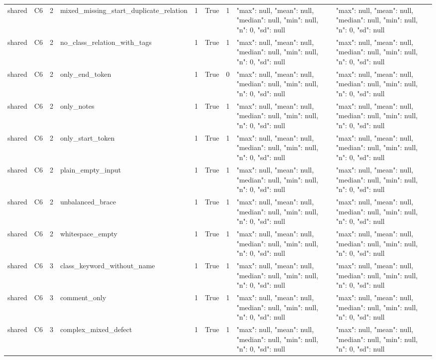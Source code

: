 \begin{tabular}{lllllllll}
shared & C6 & 2 & mixed\_missing\_start\_duplicate\_relation & 1 & True & 1 & {"max": null, "mean": null, "median": null, "min": null, "n": 0, "sd": null} & {"max": null, "mean": null, "median": null, "min": null, "n": 0, "sd": null} \\
shared & C6 & 2 & no\_class\_relation\_with\_tags & 1 & True & 1 & {"max": null, "mean": null, "median": null, "min": null, "n": 0, "sd": null} & {"max": null, "mean": null, "median": null, "min": null, "n": 0, "sd": null} \\
shared & C6 & 2 & only\_end\_token & 1 & True & 0 & {"max": null, "mean": null, "median": null, "min": null, "n": 0, "sd": null} & {"max": null, "mean": null, "median": null, "min": null, "n": 0, "sd": null} \\
shared & C6 & 2 & only\_notes & 1 & True & 1 & {"max": null, "mean": null, "median": null, "min": null, "n": 0, "sd": null} & {"max": null, "mean": null, "median": null, "min": null, "n": 0, "sd": null} \\
shared & C6 & 2 & only\_start\_token & 1 & True & 1 & {"max": null, "mean": null, "median": null, "min": null, "n": 0, "sd": null} & {"max": null, "mean": null, "median": null, "min": null, "n": 0, "sd": null} \\
shared & C6 & 2 & plain\_empty\_input & 1 & True & 1 & {"max": null, "mean": null, "median": null, "min": null, "n": 0, "sd": null} & {"max": null, "mean": null, "median": null, "min": null, "n": 0, "sd": null} \\
shared & C6 & 2 & unbalanced\_brace & 1 & True & 1 & {"max": null, "mean": null, "median": null, "min": null, "n": 0, "sd": null} & {"max": null, "mean": null, "median": null, "min": null, "n": 0, "sd": null} \\
shared & C6 & 2 & whitespace\_empty & 1 & True & 1 & {"max": null, "mean": null, "median": null, "min": null, "n": 0, "sd": null} & {"max": null, "mean": null, "median": null, "min": null, "n": 0, "sd": null} \\
shared & C6 & 3 & class\_keyword\_without\_name & 1 & True & 1 & {"max": null, "mean": null, "median": null, "min": null, "n": 0, "sd": null} & {"max": null, "mean": null, "median": null, "min": null, "n": 0, "sd": null} \\
shared & C6 & 3 & comment\_only & 1 & True & 1 & {"max": null, "mean": null, "median": null, "min": null, "n": 0, "sd": null} & {"max": null, "mean": null, "median": null, "min": null, "n": 0, "sd": null} \\
shared & C6 & 3 & complex\_mixed\_defect & 1 & True & 1 & {"max": null, "mean": null, "median": null, "min": null, "n": 0, "sd": null} & {"max": null, "mean": null, "median": null, "min": null, "n": 0, "sd": null} \\

\end{tabular}

